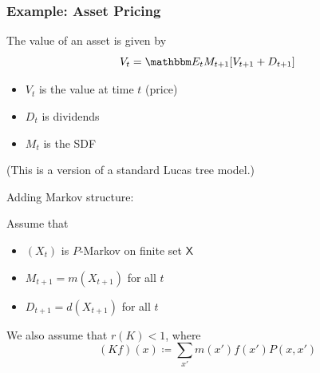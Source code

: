 \documentclass[xcolor=dvipsnames]{beamer}  %
\newcommand{\1}{\mathbbm 1}
\newcommand{\EE}{\mathbbm E}
\newcommand{\XX}{\mathsf X}
\begin{document}
\begin{frame}
    \frametitle{Example: Asset Pricing}

    The value of an asset is given by
    \begin{equation*}
        V_t = \EE_t M_{t+1} [V_{t+1} + D_{t+1}]
    \end{equation*}

            \vspace{0.5em}
            \vspace{0.5em}

    \begin{itemize}
        \item $V_t$ is the value at time $t$ (price)
            \vspace{0.5em}
        \item $D_t$ is dividends 
            \vspace{0.5em}
        \item $M_t$ is the SDF
    \end{itemize}

            \vspace{0.5em}
            \vspace{0.5em}
    (This is a version of a standard Lucas tree model.)

\end{frame}


\begin{frame}

    Adding Markov structure:
    
            \vspace{0.5em}
            \vspace{0.5em}
    Assume that 
    \begin{itemize}
        \item $(X_t)$ is $P$-Markov on finite set $\XX$
            \vspace{0.5em}
        \item $M_{t+1} = m(X_{t+1})$ for all $t$
            \vspace{0.5em}
        \item $D_{t+1} = d(X_{t+1})$ for all $t$
    \end{itemize}

            \vspace{0.5em}
            \vspace{0.5em}
    We also assume that $r(K) < 1$, where
    \begin{equation*}
        (Kf)(x) \coloneq \sum_{x'} m(x') f(x')  P(x,x') 
    \end{equation*}

\end{frame}
\end{document}
